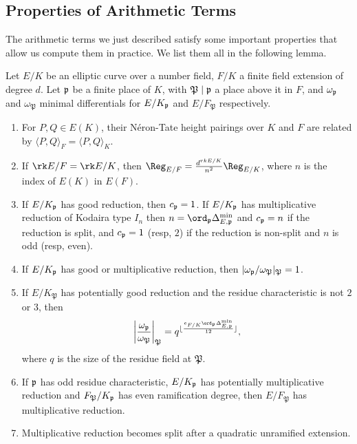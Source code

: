 \subsection{Properties of Arithmetic Terms}

The arithmetic terms we just described satisfy some important properties that allow us compute them in practice. We list them all in the following lemma.

\begin{lemma}
    Let $E/K$ be an elliptic curve over a number field, $F/K$ a finite field extension of degree $d$. Let $\mathfrak{p}$ be a finite place of $K$, with $\mathfrak{P}\mid\mathfrak{p}$ a place above it in $F$, and $\omega_{\mathfrak{p}}$ and $\omega_\mathfrak{P}$ minimal differentials for $E/K_{\mathfrak{p}}$ and $E/F_\mathfrak{P}$ respectively.
    \begin{enumerate}
        \item For $P,Q\in E(K)$, their Néron-Tate height pairings over $K$ and $F$ are related by $\langle P,Q\rangle_F=\langle P,Q\rangle_K$.
        \item If $\rk E/F=\rk E/K$, then $\Reg_{E/F}=\frac{d^{rk E/K}}{n^2}\Reg_{E/K}$, where $n$ is the index of $E(K)$ in $E(F)$.
        \item If $E/K_{\mathfrak{p}}$ has good reduction, then $c_{\mathfrak{p}}=1$. If $E/K_{\mathfrak{p}}$ has multiplicative reduction of Kodaira type $I_n$ then $n=\ord_\pp\Delta_{E,\pp}^{\min}$ and $c_{\mathfrak{p}}=n$ if the reduction is split, and $c_{\mathfrak{p}}=1$ (resp, $2$) if the reduction is non-split and $n$ is odd (resp, even).
        \item If $E/K_{\mathfrak{p}}$ has good or multiplicative reduction, then $|\omega_{\mathfrak{p}}/\omega_\mathfrak{P}|_\mathfrak{P}=1$.
        \item If $E/K_\mathfrak{P}$ has potentially good reduction and the residue characteristic is not $2$ or $3$, then 
        $$\left|\frac{\omega_\pp}{\omega_\mathfrak{P}}\right|_\mathfrak{P}=q^{\floor{\frac{e_{F/K}\ord_\pp\Delta_{E,\pp}^{\min}}{12}}},$$
        where $q$ is the size of the residue field at $\mathfrak{P}$.
        \item If $\mathfrak{p}$ has odd residue characteristic, $E/K_{\mathfrak{p}}$ has potentially multiplicative reduction and $F_\mathfrak{P}/K_{\mathfrak{p}}$ has even ramification degree, then $E/F_\mathfrak{P}$ has multiplicative reduction.
        \item Multiplicative reduction becomes split after a quadratic unramified extension.
    \end{enumerate}
\end{lemma}